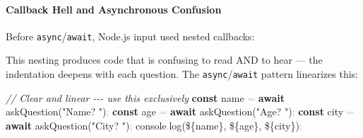 \documentclass[
  justified,
  openright,
]{tufte-book}
\let\subsection\paragraph
\let\paragraph\paragraph
\newcommand{\KeywordTok}[1]{\textcolor{CodeKeyword}{\textbf{#1}}}  %
\newcommand{\StringTok}[1]{\textcolor{CodeString}{#1}}              %
\newcommand{\CommentTok}[1]{\textcolor{CodeComment}{\textit{#1}}}  %
\newcommand{\CodeFuncTok}[1]{\textcolor{CodeKeyword}{#1}}           %
\newcommand{\OperatorTok}[1]{\textcolor{DarkGray}{#1}}              %
\newenvironment{Shaded}{%
  \begin{mdframed}[style=TufteCode]%
}{%
  \end{mdframed}%
}
\let\subsection\paragraph
\let\paragraph\paragraph
\begin{document}
\subsection{Callback Hell and Asynchronous
Confusion}\label{callback-hell-and-asynchronous-confusion}

Before \texttt{async}/\texttt{await}, Node.js input used nested
callbacks:

\begin{Shaded}
\end{Shaded}

This nesting produces code that is confusing to read AND to hear --- the
indentation deepens with each question. The
\texttt{async}/\texttt{await} pattern linearizes this:

\begin{Shaded}
\begin{Highlighting}[]
\CommentTok{// Clear and linear {-}{-}{-} use this exclusively}
\KeywordTok{const} name \OperatorTok{=} \KeywordTok{await} \CodeFuncTok{askQuestion}(\StringTok{"Name? "})\OperatorTok{;}
\KeywordTok{const} age \OperatorTok{=} \KeywordTok{await} \CodeFuncTok{askQuestion}(\StringTok{"Age? "})\OperatorTok{;}
\KeywordTok{const} city \OperatorTok{=} \KeywordTok{await} \CodeFuncTok{askQuestion}(\StringTok{"City? "})\OperatorTok{;}
console\OperatorTok{.}\CodeFuncTok{log}(\StringTok{\textasciigrave{}}\StringTok{\$\{}name\StringTok{\}}\StringTok{, }\StringTok{\$\{}age\StringTok{\}}\StringTok{, }\StringTok{\$\{}city\StringTok{\}}\StringTok{\textasciigrave{}})\OperatorTok{;}
\end{Highlighting}
\end{Shaded}
\end{document}
